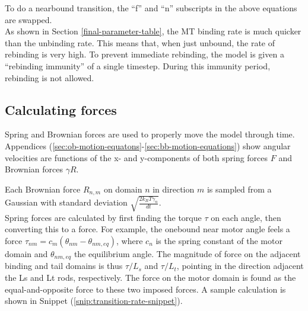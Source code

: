 \documentclass[
11pt, %
english, %
singlespacing, %
headsepline, %
chapterinoneline, %
]{MastersDoctoralThesis} %
\begin{document}
To do a nearbound transition, the ``f'' and ``n'' subscripts in the above equations are swapped.\\

As shown in Section \ref{final-parameter-table}, the MT binding rate is much quicker than the unbinding rate. This means that, when just unbound, the rate of rebinding is very high. To prevent immediate rebinding, the model is given a ``rebinding immunity'' of a single timestep. During this immunity period, rebinding is not allowed.\\




\subsection{Calculating forces}
Spring and Brownian forces are used to properly move the model through time. Appendices (\ref{sec:ob-motion-equatons}-\ref{sec:bb-motion-equations}) show angular velocities are functions of the x- and y-components of both spring forces $F$ and Brownian forces $\gamma R$.

Each Brownian force $R_{n,m}$ on domain $n$ in direction $m$ is sampled from a Gaussian with standard deviation $\sqrt{\frac{2k_BT\gamma_n}{dt}}$.\\

Spring forces are calculated by first finding the torque $\tau$ on each angle, then converting this to a force. For example, the onebound near motor angle feels a force $\tau_{nm} = c_m(\theta_{nm}-\theta_{nm,eq})$, where $c_n$ is the spring constant of the motor domain and $\theta_{nm,eq}$ the equilibrium angle. The magnitude of force on the adjacent binding and tail domains is thus $\tau/L_s$ and $\tau/L_t$, pointing in the direction adjacent the Ls and Lt rods, respectively. The force on the motor domain is found as the equal-and-opposite force to these two imposed forces. A sample calculation is shown in Snippet (\ref{snip:transition-rate-snippet}).\\
\end{document}

